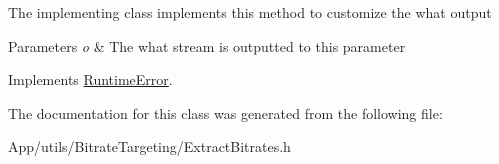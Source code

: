 The implementing class implements this method to customize the what output 
\begin{DoxyParams}{Parameters}
{\em o} & The what stream is outputted to this parameter \\
\hline
\end{DoxyParams}


Implements \hyperlink{class_runtime_error_a5020b04a2a7fac8b1dbfbfe4a30055b0}{Runtime\+Error}.



The documentation for this class was generated from the following file\+:\begin{DoxyCompactItemize}
\item 
App/utils/\+Bitrate\+Targeting/Extract\+Bitrates.\+h\end{DoxyCompactItemize}
